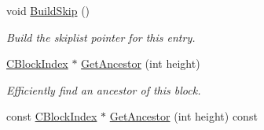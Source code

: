 \begin{DoxyCompactItemize}
\item 
void \hyperlink{class_c_block_index_a21209a71e50daf10e283bd4049e46f64}{Build\+Skip} ()
\begin{DoxyCompactList}\small\item\em Build the skiplist pointer for this entry. \end{DoxyCompactList}\item 
\hyperlink{class_c_block_index}{C\+Block\+Index} $\ast$ \hyperlink{class_c_block_index_ae1f702384690c6b8302e026a84172ef3}{Get\+Ancestor} (int height)
\begin{DoxyCompactList}\small\item\em Efficiently find an ancestor of this block. \end{DoxyCompactList}\item 
const \hyperlink{class_c_block_index}{C\+Block\+Index} $\ast$ \hyperlink{class_c_block_index_a554a9f67d26a4dce71b30b6e3ccc54da}{Get\+Ancestor} (int height) const 
\end{DoxyCompactItemize}
